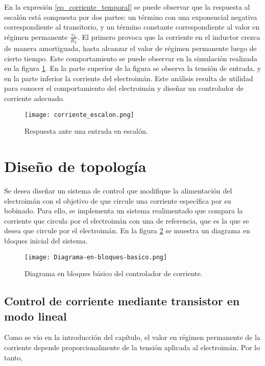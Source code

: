 En la expresión \ref{eq_corriente_temporal} se puede observar que la respuesta al escalón está compuesta por dos partes: un término con una exponencial negativa correspondiente al transitorio, y un término constante correspondiente al valor en régimen permanente $\frac{v_L}{R_L}$. El primero provoca que la corriente en el inductor crezca de manera amortiguada, hasta alcanzar el valor de régimen permanente luego de cierto tiempo. Este comportamiento se puede observar en la simulación realizada en la figura \ref{fig:img_respuesta_escalon}. En la parte superior de la figura se observa la tensión de entrada, y en la parte inferior la corriente del electroimán. Este análisis resulta de utilidad para conocer el comportamiento del electroimán y diseñar un controlador de corriente adecuado.


\begin{figure}[H]
	\centering
	\texttt{[image: corriente\_escalon.png]}
	\caption{Respuesta ante una entrada en escalón.}
	\label{fig:img_respuesta_escalon}
\end{figure}


\section{Diseño de topología}


Se desea diseñar un sistema de control que modifique la alimentación del electroimán con el objetivo de que circule una corriente específica por su bobinado.  Para ello, se implementa un sistema realimentado que compara la corriente que circula por el electroimán con una de referencia, que es la que se desea que circule por el electroimán. En la figura \ref{fig:img_diagrama_bloques_basico} se muestra un diagrama en bloques inicial del sistema.


\begin{figure}[H]
	\centering
	\texttt{[image: Diagrama-en-bloques-basico.png]}
	\caption{Diagrama en bloques básico del controlador de corriente.}
	\label{fig:img_diagrama_bloques_basico}
\end{figure}

\subsection{Control de corriente mediante transistor en modo lineal}

Como se vio en la introducción del capítulo, el valor en régimen permanente de la corriente depende proporcionalmente de la tensión aplicada al electroimán. Por lo tanto, 

